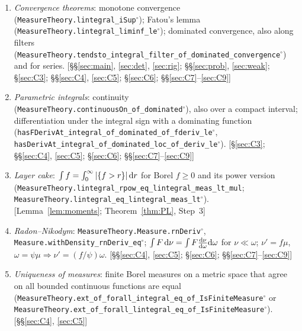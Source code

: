 \begin{enumerate}[leftmargin=2em,itemsep=1pt]
$|\det|^{-1}$ times it (\texttt{MeasureTheory.Measure.map\_linearMap\_addHaar\_eq\_smul\_addHaar}$^\circ$); translation invariance; equivalently, the volume of a finite-dimensional inner product space and its
invariance under linear isometries (\texttt{LinearIsometryEquiv.measurePreserving}$^\circ$, \texttt{OrthonormalBasis.volume\_parallelepiped}$^\circ$); scaling on $\R$ (\texttt{Real.volume\_preimage\_mul\_left}$^\circ$);
inner regularity of Lebesgue measure on Borel subsets of $\R$ by compact sets (\texttt{MeasurableSet.measure\_eq\_iSup\_isCompact}$^\circ$; Theorem~\ref{thm:PL}, Step~2). \hfill[\S\ref{sec:C3}; \S\ref{sec:C6}]
\item \emph{Convergence theorems}: monotone convergence (\texttt{MeasureTheory.lintegral\_iSup}$^\circ$); Fatou's lemma (\texttt{MeasureTheory.lintegral\_liminf\_le}$^\circ$); dominated convergence, also along
filters (\texttt{MeasureTheory.tendsto\_integral\_filter\_of\_dominated\_convergence}$^\circ$) and for series. \hfill[\S\S\ref{sec:main}, \ref{sec:det}, \ref{sec:rig}; \S\S\ref{sec:prob}, \ref{sec:weak}; \S\ref{sec:C3}; \S\S\ref{sec:C4}, \ref{sec:C5}; \S\ref{sec:C6}; \S\S\ref{sec:C7}--\ref{sec:C9}]
\item \emph{Parametric integrals}: continuity (\texttt{MeasureTheory.continuousOn\_of\_dominated}$^\circ$), also over a compact interval; differentiation under the integral sign with a dominating function
(\texttt{hasFDerivAt\_integral\_of\_dominated\_of\_fderiv\_le}$^\circ$, \texttt{hasDerivAt\_integral\_of\_dominated\_loc\_of\_deriv\_le}$^\circ$). \hfill[\S\ref{sec:C3}; \S\S\ref{sec:C4}, \ref{sec:C5}; \S\ref{sec:C6}; \S\S\ref{sec:C7}--\ref{sec:C9}]
\item \emph{Layer cake}: $\int f=\int_0^\infty|\{f>r\}|\,\mathrm{d} r$ for Borel $f\ge0$ and its power version (\texttt{MeasureTheory.lintegral\_rpow\_eq\_lintegral\_meas\_lt\_mul};
\texttt{MeasureTheory.lintegral\_eq\_lintegral\_meas\_lt}$^\circ$). \hfill[Lemma~\ref{lem:moments}; Theorem~\ref{thm:PL}, Step~3]
\item \emph{Radon--Nikodym}: \texttt{MeasureTheory.Measure.rnDeriv}$^\circ$, \texttt{Measure.withDensity\_rnDeriv\_eq}$^\circ$; $\int F\,\mathrm{d}\nu=\int F\frac{\mathrm{d}\nu}{\mathrm{d}\omega}\mathrm{d}\omega$ for $\nu\ll\omega$;
$\nu'=f\mu$, $\omega=\psi\mu\Rightarrow\nu'=(f/\psi)\omega$. \hfill[\S\S\ref{sec:C4}, \ref{sec:C5}; \S\ref{sec:C6}; \S\S\ref{sec:C7}--\ref{sec:C9}]
\item \emph{Uniqueness of measures}: finite Borel measures on a metric space that agree on all bounded continuous functions are equal
(\texttt{MeasureTheory.ext\_of\_forall\_integral\_eq\_of\_IsFiniteMeasure}$^\circ$ or \texttt{MeasureTheory.ext\_of\_forall\_lintegral\_eq\_of\_IsFiniteMeasure}$^\circ$). \hfill[\S\S\ref{sec:C4}, \ref{sec:C5}]

\end{enumerate}
